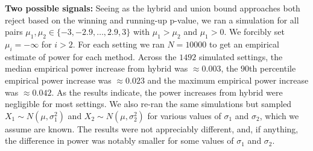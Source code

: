 \documentclass{article}
\begin{document}
\begin{appendix}
\noindent \textbf{Two possible signals: } Seeing as the hybrid and union bound approaches both reject based on the winning and running-up p-value, we ran a simulation for all pairs $\mu_1, \mu_2 \in \{-3, -2.9, \dots, 2.9, 3 \}$ with $\mu_1 > \mu_2$ and $\mu_1 > 0$. We forcibly set $\mu_i = -\infty$ for $i > 2$. For each setting we ran $N=10000$ to get an empirical estimate of power for each method. Across the $1492$ simulated settings, the median empirical power increase from hybrid was $\approx 0.003$, the $90$th percentile empirical power increase was $\approx 0.023$ and the maximum empirical power increase was $\approx 0.042$. As the results indicate, the power increases from hybrid were negligible for most settings. We also re-ran the same simulations but sampled $X_1 \sim N(\mu, \sigma_1^2)$ and $X_2 \sim N(\mu, \sigma_2^2)$ for various values of $\sigma_1$ and $\sigma_2$, which we assume are known. The results were not appreciably different, and, if anything, the difference in power was notably smaller for some values of $\sigma_1$ and $\sigma_2$.  


\end{appendix}
\end{document}
